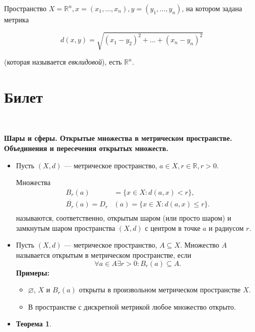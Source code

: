 \documentclass[a4paper,100pt]{article}
\theoremstyle{indented}
\newtheorem{theorem}{Теорема}
\begin{document}
\medskip

Пространство $X=\mathbb{R}^n, x=(x_1, \dots, x_n), y=(y_1, \dots, y_n)$, на котором задана метрика

\[
    d(x, y)=\sqrt{(x_1-y_2)^2+\dots+(x_n-y_n)^2}
\]


(которая называется \textit{евклидовой}), есть $\mathbb{R}^n$.

\section{Билет} \

\medskip

\textbf{Шары и сферы. Открытые множества в метрическом пространстве. Объединения и пересечения открытых множеств.}
    \begin{itemize}
    \item Пусть $\left(X, d\right)$ --- метрическое пространство, $a \in X, r \in \mathbb R, r > 0.$
    
    Множества 
    \[
    \begin{aligned}
        B_r(a) &= \{x \in X : d(a,x) < r\}, \\
        \overline{B_r} (a) = D_r &(a) = \{x \in X: d(a,x) \leq r\}. \\
    \end{aligned}
    \]
    называются, соответственно, открытым \hypertarget{n3}{шаром} (или просто шаром) и замкнутым шаром пространства $\left(X,d\right)$ с центром в точке $a$ и радиусом $r$.
    \item Пусть $\left(X, d\right)$ --- метрическое пространство, $A \subseteq X$. Множество $A$ называется \hypertarget{n4}{открытым} в метрическом пространстве, если
    \[
        \forall a \in A \exists r > 0: B_r(a) \subseteq A.
    \]
    \textbf{Примеры:} \begin{itemize}
        \item $\varnothing$, $X$ и $B_r(a)$ открыты в произвольном метрическом пространстве $X$.
        \item В пространстве с дискретной метрикой любое множество открыто.
    \end{itemize}
    \item 
    \begin{theorem}
    

\end{theorem}
\end{itemize}
\end{document}
